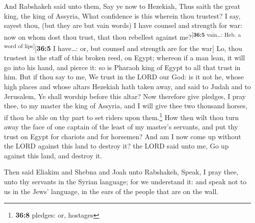  And Rabshakeh said unto them, Say ye now to Hezekiah,
Thus saith the great king, the king of Assyria, What confidence is this
wherein thou trustest?  I say, sayest thou, (but they are
but vain words) I have counsel and strength for war: now on whom dost
thou trust, that thou rebellest against
me?\textsuperscript{{[}\textbf{36:5} vain\ldots: Heb. a word of
lips{]}}{[}\textbf{36:5} I have\ldots: or, but counsel and strength are
for the war{]}  Lo, thou trustest in the staff of this
broken reed, on Egypt; whereon if a man lean, it will go into his hand,
and pierce it: so is Pharaoh king of Egypt to all that trust in him.
 But if thou say to me, We trust in the LORD our God: is
it not he, whose high places and whose altars Hezekiah hath taken away,
and said to Judah and to Jerusalem, Ye shall worship before this altar?
 Now therefore give pledges, I pray thee, to my master the
king of Assyria, and I will give thee two thousand horses, if thou be
able on thy part to set riders upon them.\footnote{\textbf{36:8}
  pledges: or, hostages}  How then wilt thou turn away the
face of one captain of the least of my master's servants, and put thy
trust on Egypt for chariots and for horsemen?  And am I
now come up without the LORD against this land to destroy it? the LORD
said unto me, Go up against this land, and destroy it.

 Then said Eliakim and Shebna and Joah unto Rabshakeh,
Speak, I pray thee, unto thy servants in the Syrian language; for we
understand it: and speak not to us in the Jews' language, in the ears of
the people that are on the wall.

